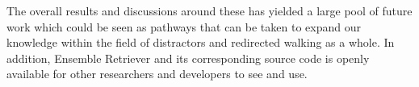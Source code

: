 The overall results and discussions around these has yielded a large pool of future work which could be seen as pathways that can be taken to expand our knowledge within the field of distractors and redirected walking as a whole. In addition, Ensemble Retriever and its corresponding source code is openly available for other researchers and developers to see and use. 


\hypersetup{pageanchor=false}